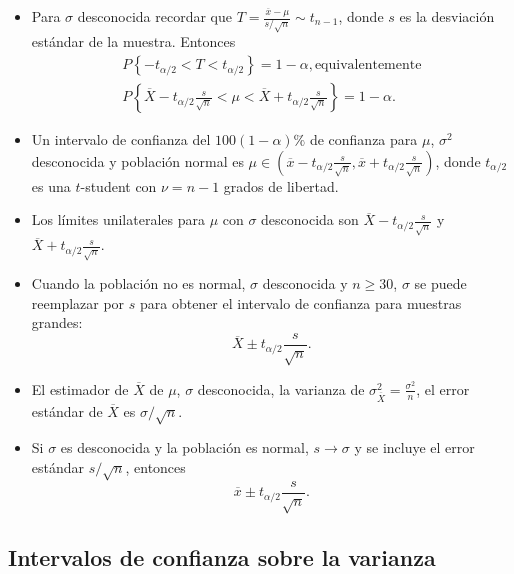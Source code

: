 \begin{itemize}
\item Para $\sigma$ desconocida recordar que $T=\frac{\overline{x}-\mu}{s/\sqrt{n}}\sim t_{n-1}$, donde $s$ es la desviaci\'on est\'andar de la muestra. Entonces
\begin{eqnarray*}
P\left\{-t_{\alpha/2}<T<t_{\alpha/2}\right\}=1-\alpha,\textrm{equivalentemente}\\
P\left\{\overline{X}-t_{\alpha/2}\frac{s}{\sqrt{n}}<\mu<\overline{X}+t_{\alpha/2}\frac{s}{\sqrt{n}}\right\}=1-\alpha.
\end{eqnarray*}

\item Un intervalo de confianza del $100\left(1-\alpha\right)\%$  de confianza para $\mu$, $\sigma^{2}$ desconocida y poblaci\'on normal es $\mu\in\left(\overline{x}-t_{\alpha/2}\frac{s}{\sqrt{n}},\overline{x}+t_{\alpha/2}\frac{s}{\sqrt{n}}\right)$, donde $t_{\alpha/2}$ es una $t$-student con $\nu=n-1$ grados de libertad.
\item Los l\'imites unilaterales para $\mu$ con $\sigma$ desconocida son $\overline{X}-t_{\alpha/2}\frac{s}{\sqrt{n}}$ y $\overline{X}+t_{\alpha/2}\frac{s}{\sqrt{n}}$.
\end{itemize}










\begin{itemize}
\item Cuando la poblaci\'on no es normal, $\sigma$ desconocida y $n\geq30$, $\sigma$ se puede reemplazar por $s$ para obtener el intervalo de confianza para muestras grandes:
$$\overline{X}\pm t_{\alpha/2}\frac{s}{\sqrt{n}}.$$

\item El estimador de $\overline{X}$ de $\mu$,  $\sigma$ desconocida, la varianza de $\sigma_{\overline{X}}^{2}=\frac{\sigma^{2}}{n}$, el error est\'andar de $\overline{X}$ es $\sigma/\sqrt{n}$.

\item Si $\sigma$ es desconocida y la poblaci\'on es normal, $s\rightarrow\sigma$ y se incluye el error est\'andar $s/\sqrt{n}$, entonces $$\overline{x}\pm t_{\alpha/2}\frac{s}{\sqrt{n}}.$$
\end{itemize}




\subsection*{Intervalos de confianza sobre la varianza}





